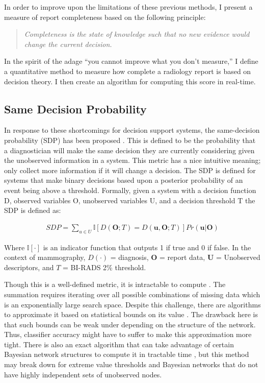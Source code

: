 In order to improve upon the limitations of these previous methods, I present a measure of report completeness based on the following principle:

\begin{quote}
\begin{center}
		\emph{Completeness is the state of knowledge such that no new evidence would change the current decision.}
\end{center}
\end{quote}


In the spirit of the adage ``you cannot improve what you don't measure,'' I define a quantitative method to measure how complete a radiology report is based on decision theory. I then create an algorithm for computing this score in real-time.

\subsection{Same Decision Probability}
In response to these shortcomings for decision support systems, the same-decision probability (SDP) has been proposed \cite{Choi:2012id}. This is defined to be the probability that a diagnostician will make the same decision they are currently considering given the unobserved information in a system. This metric has a nice intuitive meaning; only collect more information if it will change a decision. The SDP is defined for systems that make binary decisions based upon a posterior probability of an event being above a threshold. Formally, given a system with a decision function D, observed variables O, unobserved variables U, and a decision threshold T the SDP is defined as:

\begin{align}
SDP = \sum_{u \in U}\mathbb{I}\left[D(\mathbf{O};T) = D(\mathbf{u},\mathbf{O};T)\right]Pr(\mathbf{u}|\mathbf{O})
\end{align}

Where $\mathbb{I}[\cdotp]$ is an indicator function that outputs 1 if true and 0 if false. 
In the context of mammography, $D(\cdotp)$ = diagnosis, $\mathbf{O}$ = report data, $\mathbf{U}$ = Unobserved descriptors, and $T$ = BI-RADS 2\% threshold.

Though this is a well-defined metric, it is intractable to compute \cite{Chen:2013tw}. The summation requires iterating over all possible combinations of missing data which is an exponentially large search space. Despite this challenge, there are algorithms to approximate it based on statistical bounds on its value \cite{Choi:2012id}. The drawback here is that such bounds can be weak under depending on the structure of the network. Thus, classifier accuracy might have to suffer to make this approximation more tight. There is also an exact algorithm that can take advantage of certain Bayesian network structures to compute it in tractable time \cite{Chen:2013tw}, but this method may break down for extreme value thresholds and Bayesian networks that do not have highly independent sets of unobserved nodes.

